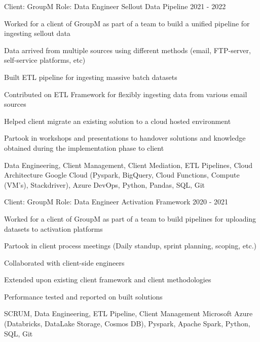 \begin{cventries}
\cventry
{Client: GroupM \newline Role: Data Engineer} %
{Sellout Data Pipeline} %
{}%
{2021 - 2022} %
{ %
\begin{cvitems}
    \item {Worked for a client of GroupM as part of a team to build a unified pipeline for ingesting sellout data}
    \item {Data arrived from multiple sources using different methods (email, FTP-server, self-service platforms, etc)}
    \item {Built ETL pipeline for ingesting massive batch datasets}
    \item {Contributed on ETL Framework for flexibly ingesting data from various email sources}
    \item {Helped client migrate an existing solution to a cloud hosted environment}
    \item {Partook in workshops and presentations to handover solutions and knowledge obtained during the implementation phase to client}
\end{cvitems}
\cventrykeywords
{Data Engineering, Client Management, Client Mediation, ETL Pipelines, Cloud Architecture}
{Google Cloud (Pyspark, BigQuery, Cloud Functions, Compute (VM’s), Stackdriver), Azure DevOps, Python, Pandas, SQL, Git}
}

\cventry
{Client: GroupM \newline Role: Data Engineer} %
{Activation Framework} %
{}%
{2020 - 2021} %
{ %
\begin{cvitems}
    \item {Worked for a client of GroupM as part of a team to build pipelines for uploading datasets to activation platforms}
    \item {Partook in client process meetings (Daily standup, sprint planning, scoping, etc.)}
    \item {Collaborated with client-side engineers}
    \item {Extended upon existing client framework and client methodologies}
    \item {Performance tested and reported on built solutions}
\end{cvitems}
\cventrykeywords
{SCRUM, Data Engineering, ETL Pipeline, Client Management}
{Microsoft Azure (Databricks, DataLake Storage, Cosmos DB), Pyspark, Apache Spark, Python, SQL, Git}
}


\end{cventries}
